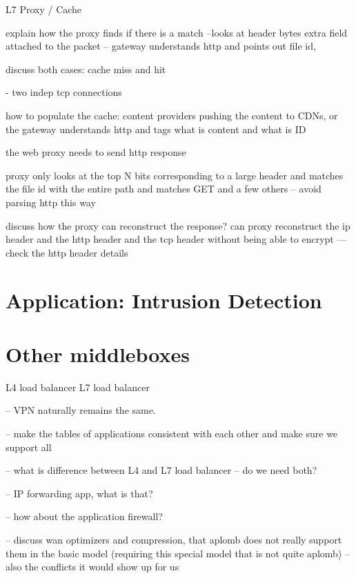 L7 Proxy / Cache

explain how the proxy finds if there is  a match --looks at header bytes
extra field attached to the packet -- gateway understands http and points out file id, 

discuss both cases: cache miss and hit

- two indep tcp connections 

how to populate the cache: content providers pushing the content to CDNs, or the gateway understands
http and tags what is content and what is ID

the web proxy needs to send http response 

proxy only looks at the top N bits corresponding to a large header and matches the file id with the entire path
and matches GET and a few others -- avoid parsing http this way


discuss how the proxy can reconstruct the response?
can proxy reconstruct the ip header and the http header  and the tcp header without being able to encrypt
--- check the http header details

\section{Application: Intrusion Detection}

\section{Other middleboxes}\label{sec:vpn} \label{sec:other_apps} \label{sec:not_supp}\label{sec:loadb}


L4 load balancer
L7 load balancer

-- VPN naturally remains the same. 

-- make the tables of applications consistent with each other and make sure we support all 

-- what is difference between L4 and L7 load balancer -- do we need both?

-- IP forwarding app, what is that?

-- how about the application firewall?

-- discuss wan optimizers and compression, that aplomb does not really support them in the basic model (requiring this special model that is not quite aplomb) -- also the conflicts it would show up for us
